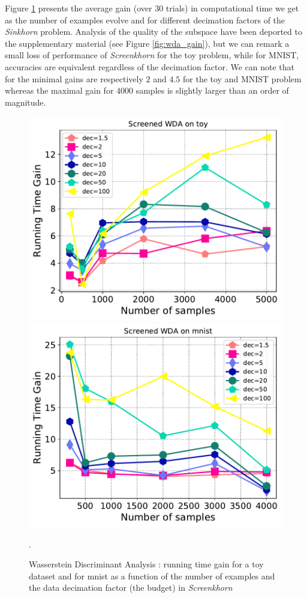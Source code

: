 Figure \ref{fig:wda} presents the average gain (over $30$ trials) in computational time we get as the number of examples evolve and for different decimation factors of the \emph{Sinkhorn} problem.
Analysis of the quality of the subspace have been deported to the supplementary material (see Figure \ref{fig:wda_gain}), but we can remark a small loss of performance of \emph{Screenkhorn} for the toy problem, while
for MNIST, accuracies are equivalent regardless of the decimation factor.  We can note
that for the minimal gains are respectively $2$ and $4.5$ for the toy and MNIST problem
whereas the maximal gain for $4000$ samples is slightly larger than an order of magnitude. 

\begin{figure}[t]
	\centering
	\includegraphics[width=6.cm]{./figs/wda_gain_toy.pdf}
\includegraphics[width=6.cm]{./figs/wda_gain_mnist.pdf}
	\caption{Wasserstein Discriminant Analysis : running time gain for a toy dataset and for mnist as a function of the number of examples and the data decimation factor (the budget) in \emph{Screenkhorn}}.
	\label{fig:wda}
\end{figure}
